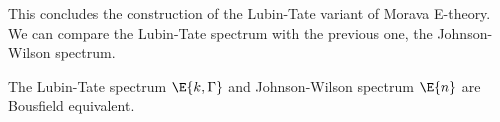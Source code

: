 This concludes the construction of the Lubin-Tate variant of Morava E-theory.
We can compare the Lubin-Tate spectrum with the previous one, the Johnson-Wilson spectrum.

\begin{proposition}
	The Lubin-Tate spectrum $\E{k, \Gamma}$ and Johnson-Wilson spectrum $\E{n}$ are Bousfield equivalent.
\end{proposition}
